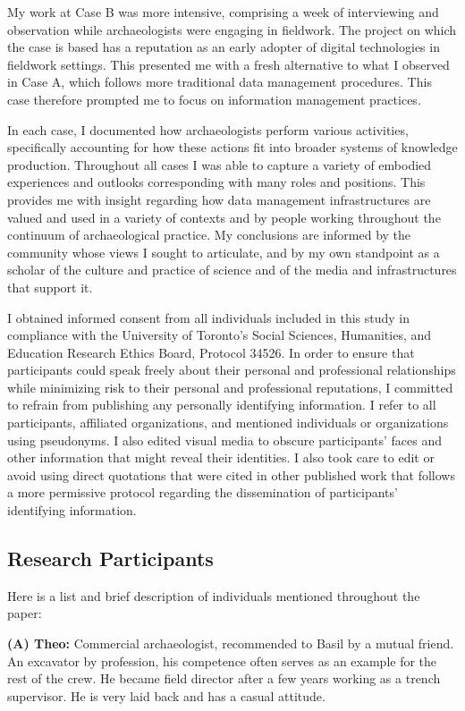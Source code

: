 \documentclass[
]{article}
\begin{document}
My work at Case B was more intensive, comprising a week of interviewing
and observation while archaeologists were engaging in fieldwork. The
project on which the case is based has a reputation as an early adopter
of digital technologies in fieldwork settings. This presented me with a
fresh alternative to what I observed in Case A, which follows more
traditional data management procedures. This case therefore prompted me
to focus on information management practices.

In each case, I documented how archaeologists perform various
activities, specifically accounting for how these actions fit into
broader systems of knowledge production. Throughout all cases I was able
to capture a variety of embodied experiences and outlooks corresponding
with many roles and positions. This provides me with insight regarding
how data management infrastructures are valued and used in a variety of
contexts and by people working throughout the continuum of
archaeological practice. My conclusions are informed by the community
whose views I sought to articulate, and by my own standpoint as a
scholar of the culture and practice of science and of the media and
infrastructures that support it.

I obtained informed consent from all individuals included in this study
in compliance with the University of Toronto's Social Sciences,
Humanities, and Education Research Ethics Board, Protocol 34526. In
order to ensure that participants could speak freely about their
personal and professional relationships while minimizing risk to their
personal and professional reputations, I committed to refrain from
publishing any personally identifying information. I refer to all
participants, affiliated organizations, and mentioned individuals or
organizations using pseudonyms. I also edited visual media to obscure
participants' faces and other information that might reveal their
identities. I also took care to edit or avoid using direct quotations
that were cited in other published work that follows a more permissive
protocol regarding the dissemination of participants' identifying
information.

\subsection{Research Participants}\label{research-participants}

Here is a list and brief description of individuals mentioned throughout
the paper:

\textbf{(A) Theo:} Commercial archaeologist, recommended to Basil by a
mutual friend. An excavator by profession, his competence often serves
as an example for the rest of the crew. He became field director after a
few years working as a trench supervisor. He is very laid back and has a
casual attitude.
\end{document}
